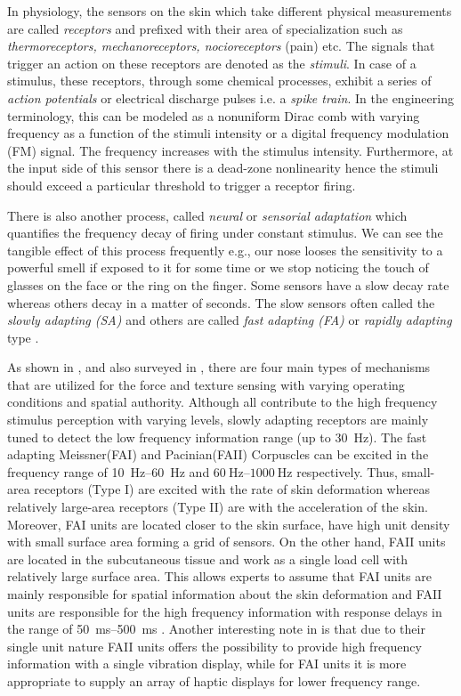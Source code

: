 In physiology, the sensors on the skin which take different physical measurements are called \emph{receptors} and prefixed with their 
area of specialization such as \emph{thermoreceptors, mechanoreceptors, nocioreceptors} (pain) etc. The signals that trigger an action on 
these receptors are denoted as the \emph{stimuli}. In case of a stimulus, these receptors, through some chemical processes, exhibit a 
series of \emph{action potentials} or electrical discharge pulses i.e. a \emph{spike train}. In the engineering terminology, this can be 
modeled as a nonuniform Dirac comb with varying frequency as a function of the stimuli intensity or a digital frequency modulation (FM) 
signal. The frequency increases with the stimulus intensity. Furthermore, at the input side of this sensor there is a dead-zone 
nonlinearity hence the stimuli should exceed a particular threshold to trigger a receptor firing.

There is also another process, called \emph{neural} or \emph{sensorial adaptation} which quantifies the frequency decay of firing under constant 
stimulus. We can see the tangible effect of this process frequently e.g., our nose looses the sensitivity to a powerful smell if exposed 
to it for some time or we stop noticing the touch of glasses on the face or the ring on the finger. Some sensors have a slow decay 
rate whereas others decay in a matter of seconds. The slow sensors often called the \emph{slowly adapting (SA)} and others are called \emph
{fast adapting (FA)} or \emph{rapidly adapting} type \cite{burdea}.


As shown in , and also surveyed in \cite{kontarinis}, there are four main types of mechanisms that are utilized for the 
force and texture sensing with varying operating conditions and spatial authority. Although all contribute to the high frequency stimulus 
perception with varying levels, slowly adapting receptors are mainly tuned to detect the low frequency information range (up to \SI{30}{
\hertz}). The fast adapting Meissner(FAI) and Pacinian(FAII) Corpuscles can be excited in the frequency range of \SIrange{10}{60}{\hertz} 
and $\SIrange{60}{1000}{\hertz}$ respectively. Thus, small-area receptors (Type I) are excited with the rate of skin deformation whereas 
relatively large-area receptors (Type II) are with the acceleration of the skin. Moreover, FAI units are located closer to the skin 
surface, have high unit density with small surface area forming a grid of sensors. On the other hand, FAII units are located in the 
subcutaneous tissue and work as a single load cell with relatively large surface area. This allows experts to assume that FAI units are 
mainly responsible for spatial information about the skin deformation and FAII units are responsible for the high frequency information 
with response delays in the range of \SIrange{50}{500}{\milli\second} \cite{idareview}. Another interesting note in \cite{kontarinis} is 
that due to their single unit nature FAII units offers the possibility to provide high frequency information with a single vibration 
display, while for FAI units it is more appropriate to supply an array of haptic displays for lower frequency range.  

